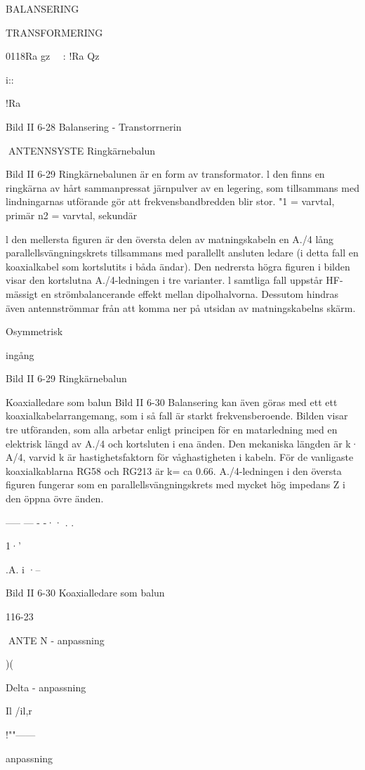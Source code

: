 {{{{BALANSERING

TRANSFORMERING

0118Ra
gz
~~: !Ra
Qz

i::

!Ra

Bild II 6-28 Balansering - Transtorrnerin

ANTENNSYSTE
Ringkärnebalun

Bild II 6-29
Ringkärnebalunen är en form av transformator. l den finns en ringkärna av hårt
sammanpressat järnpulver av en legering,
som tillsammans med lindningarnas utförande gör att frekvensbandbredden blir stor.
"1 = varvtal, primär
n2 = varvtal, sekundär

l den mellersta figuren är den översta
delen av matningskabeln en A./4 lång parallellsvängningskrets tillsammans med parallellt ansluten ledare (i detta fall en koaxialkabel som kortslutits i båda ändar). Den
nedrersta högra figuren i bilden visar den
kortslutna A./4-ledningen i tre varianter. l
samtliga fall uppstår HF-mässigt en strömbalancerande effekt mellan dipolhalvorna.
Dessutom hindras även antennströmmar från att komma ner på utsidan av matningskabelns skärm.

Osymmetrisk

ingång

Bild II 6-29 Ringkärnebalun

Koaxialledare som balun
Bild II 6-30
Balansering kan även göras med ett ett
koaxialkabelarrangemang, som i så fall är
starkt frekvensberoende. Bilden visar tre
utföranden, som alla arbetar enligt principen för en matarledning med en elektrisk
längd av A./4 och kortsluten i ena änden.
Den mekaniska längden är k· A/4, varvid
k är hastighetsfaktorn för våghastigheten i
kabeln. För de vanligaste koaxialkablarna
RG58 och RG213 är k= ca 0.66.
A./4-ledningen i den översta figuren fungerar som en parallellsvängningskrets med
mycket hög impedans Z i den öppna övre
änden.

----- --- - -·· . .

1·'

.A.
i ·--

Bild II 6-30 Koaxialledare som balun

116-23

ANTE N
- anpassning

)(

Delta - anpassning

Il
/il,r

!""------

anpassning

}}}}
